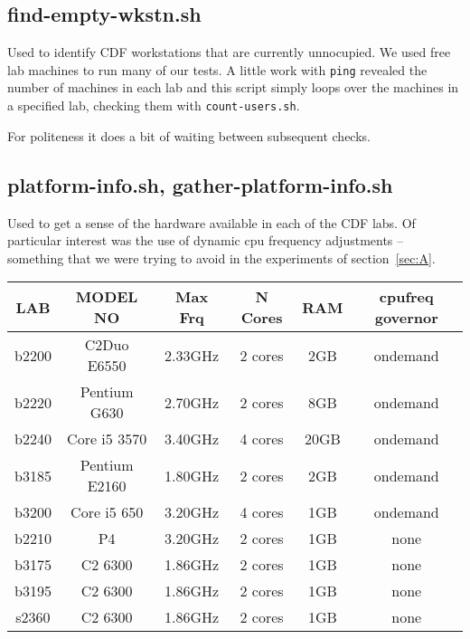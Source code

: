 \documentclass{article}
\begin{document}
\subsection{find-empty-wkstn.sh} \label{tool:find-empty}
Used to identify CDF workstations that are currently unnocupied. We used free
lab machines to run many of our tests. A little work with \lstinline{ping}
revealed the number of machines in each lab and this script simply loops over
the machines in a specified lab, checking them with \lstinline{count-users.sh}.

For politeness it does a bit of waiting between subsequent checks.
\begin{framed}
    \label{lst:find-empty}
    
\end{framed}

\subsection{platform-info.sh, gather-platform-info.sh} \label{tool:platform}
Used to get a sense of the hardware available in each of the CDF labs. Of
particular interest was the use of dynamic cpu frequency adjustments --
something that we were trying to avoid in the experiments of
section~\ref{sec:A}.

\begin{center}
    \begin{tabular}{ | c | c | c | c | c | c |}
    \hline
    LAB   & MODEL NO      & Max Frq & N Cores & RAM  & cpufreq governor \\
    \hline 
    b2200 & C2Duo E6550   & 2.33GHz & 2 cores &  2GB & ondemand \\
    b2220 & Pentium G630  & 2.70GHz & 2 cores &  8GB & ondemand \\
    b2240 & Core i5 3570  & 3.40GHz & 4 cores & 20GB & ondemand \\
    b3185 & Pentium E2160 & 1.80GHz & 2 cores &  2GB & ondemand \\
    b3200 & Core i5 650   & 3.20GHz & 4 cores &  1GB & ondemand \\
    \hline
    b2210 & P4            & 3.20GHz & 2 cores &  1GB & none \\
    b3175 & C2 6300       & 1.86GHz & 2 cores &  1GB & none \\
    b3195 & C2 6300       & 1.86GHz & 2 cores &  1GB & none \\
    s2360 & C2 6300       & 1.86GHz & 2 cores &  1GB & none \\
    \hline
\end{tabular}
\end{center}
\end{document}
